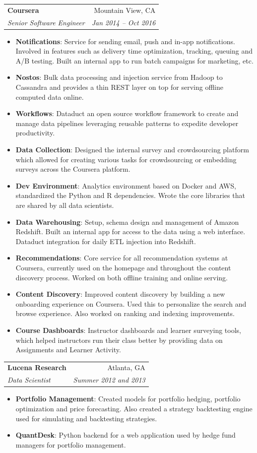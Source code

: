\documentclass[letterpaper,11pt]{article}
\makeatletter
\newcommand{\resumeItem}[2]{
  \item\small{
    \textbf{#1}{: #2 \vspace{-2pt}}
  }
}
\newcommand{\resumeSubheading}[4]{
  \vspace{-1pt}\item
    \begin{tabular*}{0.97\textwidth}[t]{l@{\extracolsep{\fill}}r}
      \textbf{#1} & #2 \\
      \textit{\small #3} & \textit{\small #4} \\
    \end{tabular*}\vspace{-5pt}
}
\newcommand{\resumeItemListStart}{\begin{itemize}}
\newcommand{\resumeItemListEnd}{\end{itemize}\vspace{-5pt}}
\makeatother
\begin{document}
    \resumeSubheading
      {Coursera}{Mountain View, CA}
      {Senior Software Engineer}{Jan 2014 -- Oct 2016}
      \resumeItemListStart
        \resumeItem{Notifications}
          {Service for sending email, push and in-app notifications. Involved in features such as delivery time optimization, tracking, queuing and A/B testing. Built an internal app to run batch campaigns for marketing, etc.}
        \resumeItem{Nostos}
          {Bulk data processing and injection service from Hadoop to Cassandra and provides a thin REST layer on top for serving offline computed data online.}
        \resumeItem{Workflows}
          {Dataduct an open source workflow framework to create and manage data pipelines leveraging reusable patterns to expedite developer productivity.}
        \resumeItem{Data Collection}
          {Designed the internal survey and crowdsourcing platform which allowed for creating various tasks for crowdsourcing or embedding surveys across the Coursera platform.}
        \resumeItem{Dev Environment}
          {Analytics environment based on Docker and AWS, standardized the Python and R dependencies. Wrote the core libraries that are shared by all data scientists.}
        \resumeItem{Data Warehousing}
          {Setup, schema design and management of Amazon Redshift. Built an internal app for access to the data using a web interface. Dataduct integration for daily ETL injection into Redshift.}
        \resumeItem{Recommendations}
          {Core service for all recommendation systems at Coursera, currently used on the homepage and throughout the content discovery process. Worked on both offline training and online serving.}
        \resumeItem{Content Discovery}
          {Improved content discovery by building a new onboarding experience on Coursera. Used this to personalize the search and browse experience. Also worked on ranking and indexing improvements.}
        \resumeItem{Course Dashboards}
          {Instructor dashboards and learner surveying tools, which helped instructors run their class better by providing data on Assignments and Learner Activity.}
      \resumeItemListEnd

    \resumeSubheading
      {Lucena Research}{Atlanta, GA}
      {Data Scientist}{Summer 2012 and 2013}
      \resumeItemListStart
        \resumeItem{Portfolio Management}
          {Created models for portfolio hedging, portfolio optimization and price forecasting. Also created a strategy backtesting engine used for simulating and backtesting strategies.}
        \resumeItem{QuantDesk}
          {Python backend for a web application used by hedge fund managers for portfolio management.}
      \resumeItemListEnd
\end{document}
